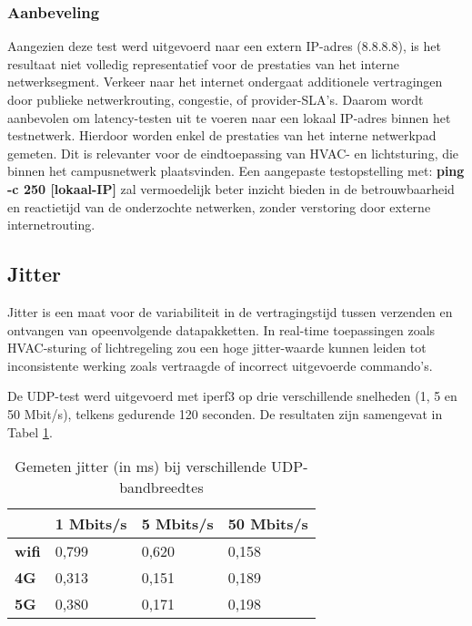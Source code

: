 \subsubsection{Aanbeveling}
Aangezien deze test werd uitgevoerd naar een extern IP-adres (8.8.8.8), is het resultaat niet volledig representatief voor de prestaties van het interne netwerksegment.
Verkeer naar het internet ondergaat additionele vertragingen door publieke netwerkrouting, congestie, of provider-SLA’s. Daarom wordt aanbevolen om latency-testen uit te voeren naar een lokaal IP-adres binnen het testnetwerk. Hierdoor worden  enkel de prestaties van het interne netwerkpad gemeten. Dit is relevanter voor de eindtoepassing van HVAC- en lichtsturing, die binnen het campusnetwerk plaatsvinden. Een aangepaste testopstelling met: \textbf{ping -c 250 [lokaal-IP]} zal vermoedelijk beter inzicht bieden in de betrouwbaarheid en reactietijd van de onderzochte netwerken, zonder verstoring door externe internetrouting.


\subsection{Jitter}
Jitter is een maat voor de variabiliteit in de vertragingstijd tussen verzenden en ontvangen van opeenvolgende datapakketten. In real-time toepassingen zoals HVAC-sturing of lichtregeling zou een hoge jitter-waarde kunnen leiden tot inconsistente werking zoals vertraagde of incorrect uitgevoerde commando’s.

De UDP-test werd uitgevoerd met iperf3 op drie verschillende snelheden (1, 5 en 50 Mbit/s), telkens gedurende 120 seconden. De resultaten zijn samengevat in Tabel \ref{tab:jitter}.

\begin{table}[]
    \caption{Gemeten jitter (in ms) bij verschillende UDP-bandbreedtes}
    \begin{tabular}{l l l l}
        \cline{2-4}
        & \textbf{1 Mbits/s} & \textbf{5 Mbits/s} & \textbf{50 Mbits/s} \\ \hline
        \multicolumn{1}{l}{\textbf{wifi}} & 0,799              & 0,620                 & 0,158               \\ \hline
        \multicolumn{1}{l}{\textbf{4G}}   & 0,313                & 0,151                & 0,189               \\ \hline
        \multicolumn{1}{l}{\textbf{5G}}   & 0,380               & 0,171                & 0,198               \\ \hline
    \end{tabular}
    
    \label{tab:jitter}
\end{table}

